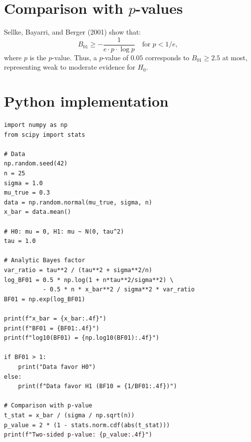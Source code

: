 \section{Comparison with $p$-values}

\begin{proposition}
Sellke, Bayarri, and Berger (2001) show that:
\[
  B_{01} \geq -\frac{1}{e \cdot p \cdot \log p}
  \quad \text{for } p < 1/e,
\]
where $p$ is the $p$-value. Thus, a $p$-value of $0.05$ corresponds to
$B_{01} \geq 2.5$ at most, representing weak to moderate evidence for
$H_0$.
\end{proposition}

\section{Python implementation}

\begin{codeblock}[title=\textbf{Bayes factor for a Gaussian test}]
\begin{verbatim}
import numpy as np
from scipy import stats

# Data
np.random.seed(42)
n = 25
sigma = 1.0
mu_true = 0.3
data = np.random.normal(mu_true, sigma, n)
x_bar = data.mean()

# H0: mu = 0, H1: mu ~ N(0, tau^2)
tau = 1.0

# Analytic Bayes factor
var_ratio = tau**2 / (tau**2 + sigma**2/n)
log_BF01 = 0.5 * np.log(1 + n*tau**2/sigma**2) \
           - 0.5 * n * x_bar**2 / sigma**2 * var_ratio
BF01 = np.exp(log_BF01)

print(f"x_bar = {x_bar:.4f}")
print(f"BF01 = {BF01:.4f}")
print(f"log10(BF01) = {np.log10(BF01):.4f}")

if BF01 > 1:
    print("Data favor H0")
else:
    print(f"Data favor H1 (BF10 = {1/BF01:.4f})")

# Comparison with p-value
t_stat = x_bar / (sigma / np.sqrt(n))
p_value = 2 * (1 - stats.norm.cdf(abs(t_stat)))
print(f"Two-sided p-value: {p_value:.4f}")
\end{verbatim}
\end{codeblock}

